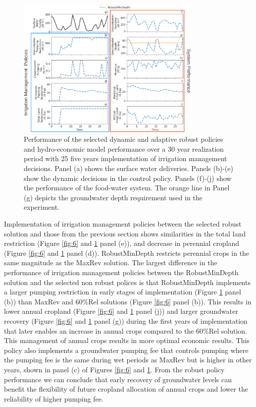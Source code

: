 \documentclass[a4paper,fleqn]{cas-sc}
\begin{document}
\begin{figure}[htb!]
    \includegraphics[width=0.8\textwidth,center]{./figs/robust_highsd_performance.png}
    \caption{Performance of the selected dynamic and adaptive robust policies and hydro-economic model performance over a 30 year realization period with 25 five years implementation of irrigation management decisions. Panel (a) shows the surface water deliveries. Panels (b)-(e) show the dynamic decisions in the control policy. Panels (f)-(j) show the performance of the food-water system. The orange line in Panel (g) depicts the groundwater depth requirement used in the experiment.} \label{fig:8}
\end{figure}

Implementation of irrigation management policies between the selected robust solution and those from the previous section shows similarities in the total land restriction (Figure \ref{fig:6} and \ref{fig:8} panel (e)), and decrease in perennial cropland (Figure \ref{fig:6} and \ref{fig:8} panel (d)). RobustMinDepth restricts perennial crops in the same magnitude as the MaxRev solution. The largest difference in the performance of irrigation management policies between the RobustMinDepth solution and the selected non robust polices is that RobustMinDepth implements a larger pumping restriction in early stages of implementation (Figure \ref{fig:8} panel (b)) than MaxRev and 60\%Rel solutions (Figure \ref{fig:6} panel (b)). This results in lower annual cropland (Figure \ref{fig:6} and \ref{fig:8} panel (j)) and larger groundwater recovery (Figure \ref{fig:6} and \ref{fig:8} panel (g)) during the first years of implementation that later enables an increase in annual crops compared to  the 60\%Rel solution. This management of annual crops results in more optimal economic results. This policy also implements a groundwater pumping fee that controls pumping where the pumping fee is the same during wet periods as MaxRev but is higher in other years, shown in panel (c) of Figures \ref{fig:6} and \ref{fig:8}. From the robust policy performance we can  conclude that early recovery of groundwater levels can benefit the flexibility of future cropland allocation of annual crops and lower the reliability of higher pumping fee.  
\end{document}
